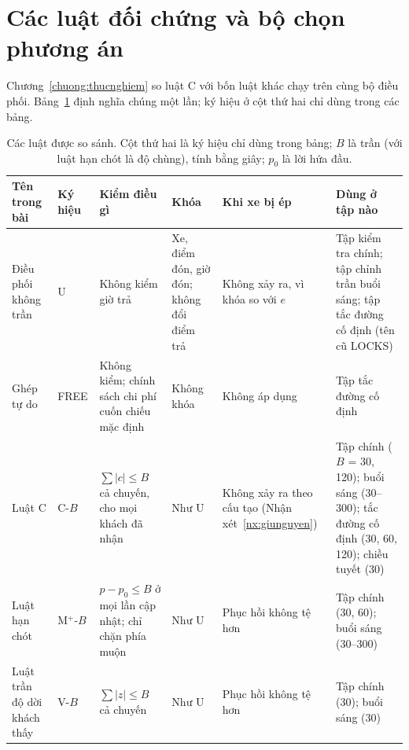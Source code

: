 \section{Các luật đối chứng và bộ chọn phương án}
\label{muc:doichung}

Chương~\ref{chuong:thucnghiem} so luật C với bốn luật khác chạy trên cùng bộ điều phối.
Bảng~\ref{bang:luat} định nghĩa chúng một lần; ký hiệu ở cột thứ hai chỉ dùng trong các bảng.

\begin{table}[htbp]
\centering
\caption{Các luật được so sánh. Cột thứ hai là ký hiệu chỉ dùng trong bảng; $B$ là trần (với luật hạn
chót là độ chùng), tính bằng giây; $p_0$ là lời hứa đầu.}
\label{bang:luat}
\footnotesize
\setlength{\tabcolsep}{3pt}
\begin{tabular}{@{}p{2.1cm}p{1.1cm}p{3.4cm}p{2.2cm}p{2.3cm}p{3.6cm}@{}}
\toprule
\textbf{Tên trong bài} & \textbf{Ký hiệu} & \textbf{Kiểm điều gì} & \textbf{Khóa} & \textbf{Khi xe bị ép}
& \textbf{Dùng ở tập nào}\\
\midrule
Điều phối không trần & U & Không kiểm giờ trả & Xe, điểm đón, giờ đón; không đổi điểm trả & Không xảy
ra, vì khóa so với $e$ & Tập kiểm tra chính; tập chỉnh trần buổi sáng; tập tắc đường cố định (tên cũ
LOCKS)\\
Ghép tự do & FREE & Không kiểm; chính sách chi phí cuốn chiếu mặc định & Không khóa & Không áp dụng &
Tập tắc đường cố định\\
Luật C & C-$B$ & $\sum |c| \le B$ cả chuyến, cho mọi khách đã nhận & Như U & Không xảy ra theo cấu tạo
(Nhận xét~\ref{nx:giunguyen}) & Tập chính ($B$ = 30, 120); buổi sáng (30--300); tắc đường cố định (30,
60, 120); chiều tuyết (30)\\
Luật hạn chót & M$^{+}$-$B$ & $p - p_0 \le B$ ở mọi lần cập nhật; chỉ chặn phía muộn & Như U & Phục hồi
không tệ hơn & Tập chính (30, 60); buổi sáng (30--300)\\
Luật trần độ dời khách thấy & V-$B$ & $\sum |z| \le B$ cả chuyến & Như U & Phục hồi không tệ hơn & Tập
chính (30); buổi sáng (30)\\
\bottomrule
\end{tabular}
\end{table}

